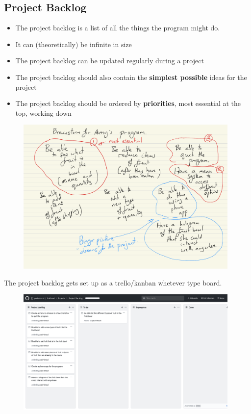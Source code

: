 \documentclass[a4paper,12pt]{article}
\begin{document}
	\subsection{Project Backlog}
	\begin{itemize}
		\item The project backlog is a list of all the things the program might do.
		\item It can (theoretically) be infinite in size
		\item The project backlog can be updated regularly during a project
		\item The project backlog should also contain the \textbf{simplest possible} ideas for the project
		\item The project backlog should be ordered by \textbf{priorities}, most essential at the top, working down
	\end{itemize}
\begin{figure}[!ht]
	\centering
	\includegraphics[width=11cm]{brainstorm_plan.pdf}
\end{figure}

The project backlog gets set up as a trello/kanban whetever type board.
\begin{figure}[!ht]
	\centering
	\includegraphics[width=11cm]{Project_backlog.png}
\end{figure}
	
\end{document}
